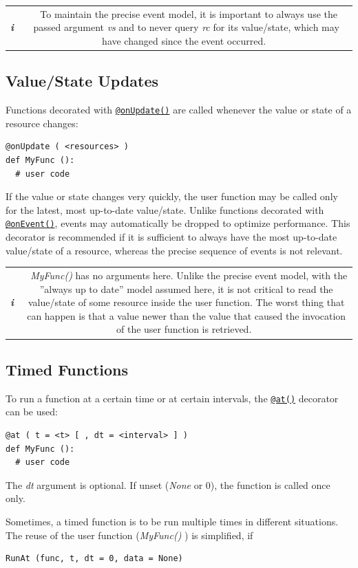 \documentclass[12pt,english,parskip=half,headheight=19pt]{scrreprt}
\newcommand{\infobox}[1]{
  \par
  \medskip
  \hfill
  \setlength\arrayrulewidth{1pt}
  \begin{tabular}[t]{c|c|}
    \parbox{1.8em}{\hfill\textit{\Huge\textbf{i}\,}}
    &
    \,\parbox{0.89\linewidth}{\setlength{\parskip}{0.5em} \small #1}\,
  \end{tabular}
  \medskip
  \par
}
\newcommand{\refapipython}[1]{\href{home2l-api_python/index.html}{\mbox{\texttt{#1}}}}  %
\begin{document}
\infobox{
  To maintain the precise event model, it is important to always use the passed argument
  \textit{vs} and to never query \textit{rc} for its value/state, which may have changed since the event occurred.
}



\subsection{Value/State Updates}

Functions decorated with \refapipython{@onUpdate()} are called whenever the value or state of a resource changes:
\begin{lstlisting}
@onUpdate ( <resources> )
def MyFunc ():
  # user code
\end{lstlisting}

If the value or state changes very quickly, the user function may be called only for the
latest, most up-to-date value/state. Unlike functions decorated with
\refapipython{@onEvent()}, events may automatically be dropped to optimize performance.
This decorator is recommended if it is sufficient to always have the most up-to-date
value/state of a resource, whereas the precise sequence of events is not relevant.

\infobox{
  \textit{MyFunc()} has no arguments here. Unlike the precise event model, with the
  ''always up to date'' model assumed here, it is not critical to read the value/state
  of some resource inside the user function. The worst thing that can happen is that
  a value newer than the value that caused the invocation of the user function is
  retrieved.
}



\subsection{Timed Functions}

To run a function at a certain time or at certain intervals, the \refapipython{@at()} decorator can be used:
\begin{lstlisting}
@at ( t = <t> [ , dt = <interval> ] )
def MyFunc ():
  # user code
\end{lstlisting}

The \textit{dt} argument is optional. If unset (\textit{None} or 0), the function is called once only.

Sometimes, a timed function is to be run multiple times in different situations.
The reuse of the user function (\textit{MyFunc()} ) is simplified, if
\begin{lstlisting}
RunAt (func, t, dt = 0, data = None)
\end{lstlisting}
\end{document}
